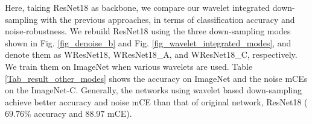 \documentclass[10pt,twocolumn,letterpaper]{article}
\begin{document}
Here, taking ResNet18 as backbone, we compare our wavelet integrated down-sampling with the previous approaches,
in terms of classification accuracy and noise-robustness.
We rebuild ResNet18 using the three down-sampling modes shown in Fig. \ref{fig_denoise_b} and Fig. \ref{fig_wavelet_integrated_modes},
and denote them as WResNet18, WResNet18\_A, and WResNet18\_C, respectively.
We train them on ImageNet when various wavelets are used.
Table \ref{Tab_result_other_modes} shows the accuracy on ImageNet
and the noise mCEs on the ImageNet-C.
Generally, the networks using wavelet based down-sampling achieve better accuracy and noise mCE
than that of original network, ResNet18 ($69.76\%$ accuracy and $88.97$ mCE).
\begin{table}
\scriptsize
	\caption{Comparison with other wavelet based down-sampling.}
	\label{Tab_result_other_modes}
\begin{center}
\end{center}
\end{table}
\end{document}
